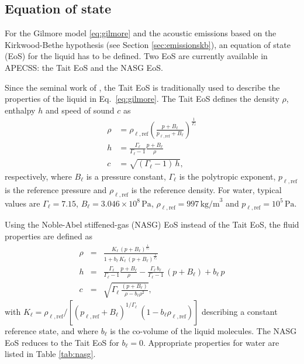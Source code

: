 \subsection{Equation of state}

For the Gilmore model \eqref{eq:gilmore} and the acoustic emissions based on the Kirkwood-Bethe hypothesis (see Section \ref{sec:emissionskb}), an equation of state (EoS) for the liquid has to be defined. Two EoS are currently available in APECSS: the Tait EoS and the NASG EoS. 

Since the seminal work of \citet{Gilmore1952}, the Tait EoS is traditionally used to describe the properties of the liquid in Eq.~\eqref{eq:gilmore}. The Tait EoS defines the density $\rho$, enthalpy $h$ and speed of sound $c$ as
\begin{align}
    \rho &= \rho_{\ell,\text{ref}} \left( \frac{p+B_\ell}{p_{\ell,\text{ref}}+B_\ell}\right)^{\frac{1}{\Gamma_\ell}} \label{eq:rho_Tait} \\
    h &= \frac{\Gamma_\ell}{\Gamma_\ell-1} \frac{p+B_\ell}{\rho} \label{eq:h_Tait} \\
    c &= \sqrt{(\Gamma_\ell -1) \, h}, \label{eq:c_Tait}
\end{align}
respectively, where $B_\ell$ is a pressure constant, $\Gamma_\ell$ is the polytropic exponent, $p_{\ell,\text{ref}}$ is the reference pressure and $\rho_{\ell,\text{ref}}$ is the reference density. For water, typical values are $\Gamma_\ell=7.15$, $B_\ell=3.046 \times 10^8 \, \text{Pa}$, $\rho_{\ell,\text{ref}} = 997 \, \mathrm{kg/m}^3$ and $p_{\ell,\text{ref}} = 10^5 \, \mathrm{Pa}$. 

Using the Noble-Abel stiffened-gas (NASG) EoS \citep{LeMetayer2016} instead of the Tait EoS, the fluid properties are defined as \citep{Denner2021}
 \begin{eqnarray}
    \rho &=& \frac{K_\ell \, (p+B_\ell)^{\frac{1}{\Gamma_\ell}}}{1+b_\ell \, K_\ell \,  (p+B_\ell)^{\frac{1}{\Gamma_\ell}}} \label{eq:rho_NASG}\\
      h &=& \frac{\Gamma_\ell}{\Gamma_\ell-1} \frac{p+B_\ell}{\rho} - \frac{\Gamma_\ell \, b_\ell}{\Gamma_\ell-1} \, (p+B_\ell) + b_\ell \, p \label{eq:h_NASG} \\
      c &=&\sqrt{\Gamma_\ell \, \frac{(p+B_\ell)}{\rho-b_\ell  \rho^2}},\label{eq:c_NASG}
    \end{eqnarray}
with $K_\ell = \rho_{\ell,\text{ref}}/[(p_{\ell,\text{ref}}+B_\ell)^{{1/\Gamma_\ell}} \ (1-b_\ell \rho_{\ell,\text{ref}})]$ describing a constant reference state, and where $b_\ell$ is the co-volume of the liquid molecules. The NASG EoS reduces to the Tait EoS for $b_\ell=0$. Appropriate properties for water are listed in Table \ref{tab:nasg}.

